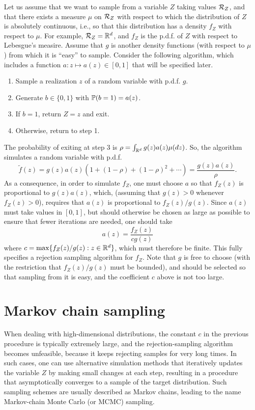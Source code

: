 Let us assume that we want to sample from a variable $Z$ taking values ${\mathcal R}_Z$, and that there exists a measure $\mu$ on ${\mathcal R}_Z$ with respect to which the distribution of $Z$ is absolutely continuous, i.e., so that this distribution has a density $f_Z$ with respect to $\mu$. For example, ${\mathcal R}_Z = {\mathbb{R}}^d$, and $f_Z$ is the p.d.f. of $Z$ with respect to Lebesgue's measire. Assume that $g$ is another density functions (with respect to $\mu$) from which it is ``easy'' to sample. Consider the following algorithm, which includes a function $a: z\mapsto a(z) \in [0,1]$ that will be specified later.
\begin{algorithm}
\begin{enumerate}
\item Sample a realization $z$ of a random variable with p.d.f. $g$.
\item  Generate $b\in \{0,1\}$ with $\bm{\mathbb P}(b=1) = a(z)$.
\item If $b=1$, return $Z=z$ and exit. 
\item Otherwise, return to step 1. 
\end{enumerate}
\end{algorithm}

The probability of exiting at step 3 is $\rho = \int_{{\mathbb{R}}^d} g(z) a(z) \mu(dz)$. So, the algorithm simulates a random variable with p.d.f.
\[
\tilde f(z) = g(z) a(z) (1+(1-\rho)+(1-\rho)^2 +\cdots) = \frac{g(z)a(z)}{\rho}.
\]
As a consequence, in order to simulate $f_Z$, one must choose $a$ so that $f_Z(z)$ is proportional to $g(z) a(z)$, which, (assuming that $g(z) > 0$ whenever $f_Z(z) > 0$), requires that $a(z)$ is proportional to $f_Z(z)/g(z)$. Since $a(z)$ must take values in $[0,1]$, but should otherwise be chosen as large as possible to ensure that fewer iterations are needed, one should take
\[
a(z) = \frac{f_Z(z)}{cg(z)}
\]
where $c = \max\{f_Z(z)/g(z): z\in{\mathbb{R}}^d\}$, which must therefore be finite. This fully specifies a rejection sampling algorithm for $f_Z$. Note that $g$ is free to choose (with the restriction that $f_Z(z)/g(z)$ must be bounded), and should be selected so that sampling from it is easy, and the coefficient $c$ above is not too large. 


\section{Markov chain sampling}
When dealing with high-dimensional distributions, the constant $c$ in the previous procedure is typically extremely large, and the rejection-sampling algorithm becomes unfeasible, because it keeps rejecting samples for very long times. In such cases, one can use alternative simulation methods that iteratively updates the variable $Z$ by making small changes at each step, resulting in a procedure that asymptotically converges to a sample of the target distribution. Such sampling schemes are usually described as Markov chains, leading to the name Markov-chain Monte Carlo (or MCMC) sampling.




